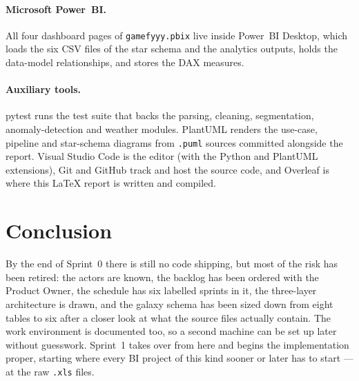 \documentclass[12pt, a4paper]{report}
\begin{document}
\paragraph{Microsoft Power~BI.} All four dashboard pages of
\texttt{gamefyyy.pbix} live inside Power~BI Desktop, which loads the
six CSV files of the star schema and the analytics outputs, holds
the data-model relationships, and stores the DAX measures.

\paragraph{Auxiliary tools.} pytest runs the test suite that
backs the parsing, cleaning, segmentation, anomaly-detection and
weather modules. PlantUML renders the use-case, pipeline and
star-schema diagrams from \texttt{.puml} sources committed alongside
the report. Visual Studio Code is the editor (with the Python and
PlantUML extensions), Git and GitHub track and host the source code,
and Overleaf is where this \LaTeX{} report is written and compiled.

\section{Conclusion}

By the end of Sprint~0 there is still no code shipping, but most of the
risk has been retired: the actors are known, the backlog has been
ordered with the Product Owner, the schedule has six labelled sprints
in it, the three-layer architecture is drawn, and the galaxy schema
has been sized down from eight tables to six after a closer look at
what the source files actually contain. The work environment is
documented too, so a second machine can be set up later without
guesswork. Sprint~1 takes over from here and begins the implementation
proper, starting where every BI project of this kind sooner or later
has to start --- at the raw \texttt{.xls} files.

\end{document}

